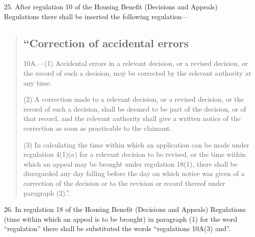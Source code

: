 \documentclass[12pt,a4paper]{article}
\begin{document}
25.  After regulation 10 of the Housing Benefit (Decisions and Appeals) Regulations there shall be inserted the following regulation—
\begin{quotation}
\subsection*{“Correction of accidental errors}

10A.---(1)  Accidental errors in a relevant decision, or a revised decision, or the record of such a decision, may be corrected by the relevant authority at any time.

(2) A correction made to a relevant decision, or a revised decision, or the record of such a decision, shall be deemed to be part of the decision, or of that record, and the relevant authority shall give a written notice of the correction as soon as practicable to the claimant.

(3) In calculating the time within which an application can be made under regulation 4(1)($a$)  for a relevant decision to be revised, or the time within which an appeal may be brought under regulation 18(1), there shall be disregarded any day falling before the day on which notice was given of a correction of the decision or to the revision or record thereof under paragraph (2).”.
\end{quotation}

\medskip

26.  In regulation 18 of the Housing Benefit (Decisions and Appeals) Regulations (time within which an appeal is to be brought) in paragraph (1) for the word “regulation” there shall be substituted the words “regulations 10A(3) and”.

\medskip
\end{document}
